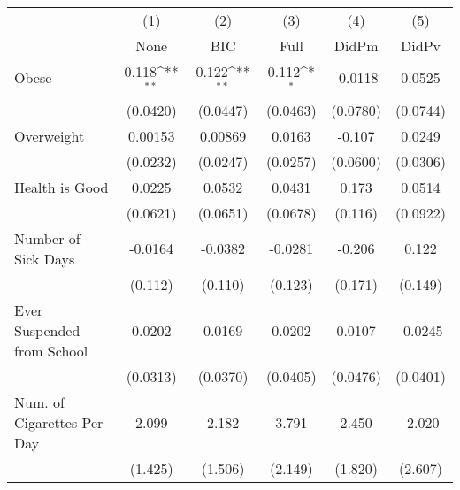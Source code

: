 {
\def\sym#1{\ifmmode^{#1}\else\(^{#1}\)\fi}
\begin{tabular}{l*{5}{c}}
\toprule
            &\multicolumn{1}{c}{(1)}&\multicolumn{1}{c}{(2)}&\multicolumn{1}{c}{(3)}&\multicolumn{1}{c}{(4)}&\multicolumn{1}{c}{(5)}\\
            &\multicolumn{1}{c}{None}&\multicolumn{1}{c}{BIC}&\multicolumn{1}{c}{Full}&\multicolumn{1}{c}{DidPm}&\multicolumn{1}{c}{DidPv}\\
\midrule
Obese       &       0.118\sym{**} &       0.122\sym{**} &       0.112\sym{*}  &     -0.0118         &      0.0525         \\
            &    (0.0420)         &    (0.0447)         &    (0.0463)         &    (0.0780)         &    (0.0744)         \\
\addlinespace
Overweight  &     0.00153         &     0.00869         &      0.0163         &      -0.107         &      0.0249         \\
            &    (0.0232)         &    (0.0247)         &    (0.0257)         &    (0.0600)         &    (0.0306)         \\
\addlinespace
Health is Good&      0.0225         &      0.0532         &      0.0431         &       0.173         &      0.0514         \\
            &    (0.0621)         &    (0.0651)         &    (0.0678)         &     (0.116)         &    (0.0922)         \\
\addlinespace
Number of Sick Days&     -0.0164         &     -0.0382         &     -0.0281         &      -0.206         &       0.122         \\
            &     (0.112)         &     (0.110)         &     (0.123)         &     (0.171)         &     (0.149)         \\
\addlinespace
Ever Suspended from School&      0.0202         &      0.0169         &      0.0202         &      0.0107         &     -0.0245         \\
            &    (0.0313)         &    (0.0370)         &    (0.0405)         &    (0.0476)         &    (0.0401)         \\
\addlinespace
Num. of Cigarettes Per Day&       2.099         &       2.182         &       3.791         &       2.450         &      -2.020         \\
            &     (1.425)         &     (1.506)         &     (2.149)         &     (1.820)         &     (2.607)         \\
\bottomrule
\end{tabular}
}
